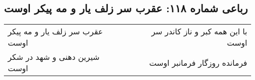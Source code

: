 \begin{center}
\section*{رباعی شماره ۱۱۸: عقرب سر زلف یار و مه پیکر اوست}
\label{sec:sh118}
\begin{longtable}{l p{0.5cm} r}
عقرب سر زلف یار و مه پیکر اوست
&&
با این همه کبر و ناز کاندر سر اوست
\\
شیرین دهنی و شهد در شکر اوست
&&
فرمانده روزگار فرمانبر اوست
\\
\end{longtable}
\end{center}
